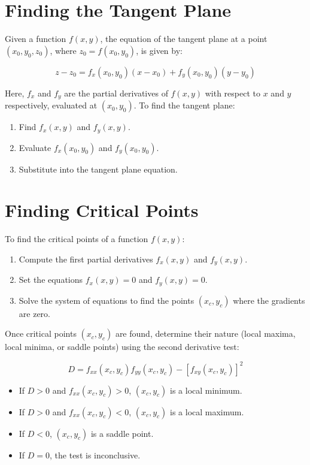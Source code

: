 \section{Finding the Tangent Plane}
Given a function $f(x, y)$, the equation of the tangent plane at a point $(x_0, y_0, z_0)$, where $z_0 = f(x_0, y_0)$, is given by:

\begin{equation}
    z - z_0 = f_x(x_0, y_0)(x - x_0) + f_y(x_0, y_0)(y - y_0)
\end{equation}

\noindent Here, $f_x$ and $f_y$ are the partial derivatives of $f(x, y)$ with respect to $x$ and $y$ respectively, evaluated at $(x_0, y_0)$. To find the tangent plane:

\begin{enumerate}
    \item Find $f_x(x, y)$ and $f_y(x, y)$.
    \item Evaluate $f_x(x_0, y_0)$ and $f_y(x_0, y_0)$.
    \item Substitute into the tangent plane equation.
\end{enumerate}

\section{Finding Critical Points}
To find the critical points of a function $f(x, y)$:

\begin{enumerate}
    \item Compute the first partial derivatives $f_x(x, y)$ and $f_y(x, y)$.
    \item Set the equations $f_x(x, y) = 0$ and $f_y(x, y) = 0$.
    \item Solve the system of equations to find the points $(x_c, y_c)$ where the gradients are zero.
\end{enumerate}

Once critical points $(x_c, y_c)$ are found, determine their nature (local maxima, local minima, or saddle points) using the second derivative test:

\begin{equation}
    D = f_{xx}(x_c, y_c) f_{yy}(x_c, y_c) - [f_{xy}(x_c, y_c)]^2
\end{equation}

\begin{itemize}
    \item If $D > 0$ and $f_{xx}(x_c, y_c) > 0$, $(x_c, y_c)$ is a local minimum.
    \item If $D > 0$ and $f_{xx}(x_c, y_c) < 0$, $(x_c, y_c)$ is a local maximum.
    \item If $D < 0$, $(x_c, y_c)$ is a saddle point.
    \item If $D = 0$, the test is inconclusive.
\end{itemize}